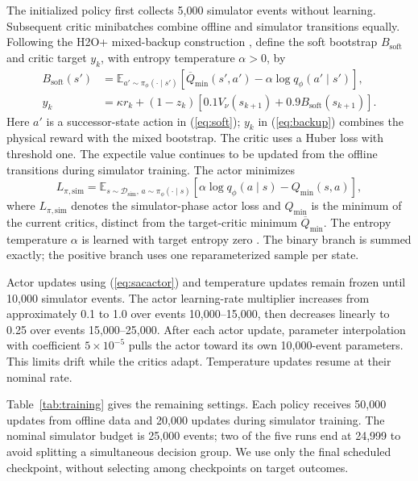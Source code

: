 \documentclass[letterpaper,journal]{IEEEtran}
\newcommand{\E}{\mathbb{E}}
\newcommand{\Qmin}{\overline{Q}_{\min}}
\begin{document}
The initialized policy first collects 5,000 simulator events without learning. Subsequent critic minibatches combine offline and simulator transitions equally. Following the H2O+ mixed-backup construction \cite{niu2025h2oplus}, define the soft bootstrap \(B_{\mathrm{soft}}\) and critic target \(y_k\), with entropy temperature \(\alpha>0\), by
\begin{align}
 B_{\mathrm{soft}}(s')&=\E_{a'\sim\pi_\phi(\cdot\mid s')}
       [\Qmin(s',a')-\alpha\log q_\phi(a'\mid s')], \label{eq:soft}\\
 y_k&=\kappa r_k+(1-z_k)
          [0.1V_\nu(s_{k+1})+0.9B_{\mathrm{soft}}(s_{k+1})].
 \label{eq:backup}
\end{align}
Here \(a'\) is a successor-state action in (\ref{eq:soft}); \(y_k\) in (\ref{eq:backup}) combines the physical reward with the mixed bootstrap. The critic uses a Huber loss with threshold one. The expectile value continues to be updated from the offline transitions during simulator training. The actor minimizes
\begin{equation}
 L_{\pi,\mathrm{sim}}=\E_{s\sim\mathcal D_{\mathrm{sim}},\,a\sim\pi_\phi(\cdot\mid s)}
       [\alpha\log q_\phi(a\mid s)-Q_{\min}(s,a)],
 \label{eq:sacactor}
\end{equation}
where \(L_{\pi,\mathrm{sim}}\) denotes the simulator-phase actor loss and \(Q_{\min}\) is the minimum of the current critics, distinct from the target-critic minimum \(\Qmin\). The entropy temperature \(\alpha\) is learned with target entropy zero \cite{haarnoja2018soft,haarnoja2018applications}. The binary branch is summed exactly; the positive branch uses one reparameterized sample per state.

Actor updates using (\ref{eq:sacactor}) and temperature updates remain frozen until 10,000 simulator events. The actor learning-rate multiplier increases from approximately 0.1 to 1.0 over events 10,000--15,000, then decreases linearly to 0.25 over events 15,000--25,000. After each actor update, parameter interpolation with coefficient \(5\times10^{-5}\) pulls the actor toward its own 10,000-event parameters. This limits drift while the critics adapt. Temperature updates resume at their nominal rate.

Table~\ref{tab:training} gives the remaining settings. Each policy receives 50,000 updates from offline data and 20,000 updates during simulator training. The nominal simulator budget is 25,000 events; two of the five runs end at 24,999 to avoid splitting a simultaneous decision group. We use only the final scheduled checkpoint, without selecting among checkpoints on target outcomes.
\end{document}
